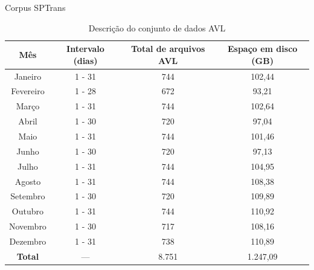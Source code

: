 \documentclass{beamer}
\begin{document}
\begin{frame}{Corpus SPTrans}
\begin{table}[!htb]
\begin{adjustbox}{max height=10mm, width=4in}
\begin{threeparttable}
\centering
\caption{Descrição do conjunto de dados AVL}
\label{tab:avlDataset}
\begin{tabular}{ c | c | c | c }
\toprule
\textbf{Mês} & \textbf{Intervalo (dias)} & \textbf{Total de arquivos AVL} & \textbf{Espaço em disco (GB)} \\
\midrule
Janeiro\tnote{a} & 1 - 31 & 744 & 102,44 \\
\hline
 Fevereiro & 1 - 28 & 672 & 93,21 \\
\hline
 Março & 1 - 31 & 744 & 102,64 \\
\hline
 Abril & 1 - 30 & 720 & 97,04 \\
\hline
 Maio & 1 - 31 & 744 & 101,46 \\
\hline
 Junho & 1 - 30 & 720 & 97,13 \\
\hline
 Julho & 1 - 31 & 744 & 104,95 \\
\hline
 Agosto & 1 - 31 & 744 & 108,38 \\
\hline
 Setembro & 1 - 30 & 720 & 109,89 \\
\hline
 Outubro & 1 - 31 & 744 & 110,92 \\
\hline
 Novembro & 1 - 30 & 717 & 108,16 \\
\hline
 Dezembro & 1 - 31 & 738 & 110,89 \\
\midrule
\midrule
\textbf{Total} & --- & 8.751 & 1.247,09 \\
\bottomrule
\end{tabular}
\begin{tablenotes}

\end{tablenotes}
\end{threeparttable}
\end{adjustbox}
\end{table}
\end{frame}
\end{document}
